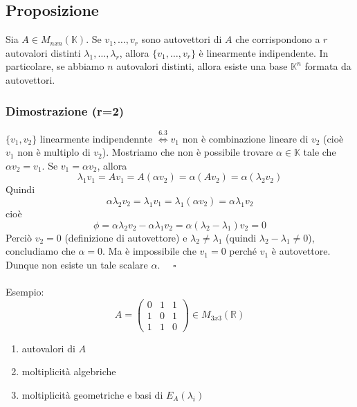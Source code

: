\documentclass[12pt]{article}
\begin{document}
\subsection{Proposizione}

Sia $A \in M_{nxn} (\mathbb{K})$. Se $v_1, \dots, v_r$ sono autovettori di $A$ che corrispondono a $r$ autovalori distinti $\lambda_1, \dots, \lambda_r$, allora $\{v_1, \dots, v_r\}$ è linearmente indipendente. In particolare, se abbiamo $n$ autovalori distinti, allora esiste una base $\mathbb{K}^n$ formata da autovettori.

 \subsubsection{Dimostrazione (r=2)}

$\{v_1, v_2\}$ linearmente indipendennte $\stackrel{6.3}{\iff} v_1$ non è combinazione lineare di $v_2$ (cioè $v_1$ non è multiplo di $v_2$). Mostriamo che non è possibile trovare $\alpha \in \mathbb{K}$ tale che $\alpha v_2 = v_1$.
Se $v_1 =  \alpha v_2$, allora \[\lambda_1 v_1 = Av_1 = A (\alpha v_2) = \alpha (Av_2) = \alpha(\lambda_2 v_2)\]
Quindi
\[\alpha \lambda_2 v_2 = \lambda_1 v_1 = \lambda_1 (\alpha v_2) = \alpha\lambda_1v_2\]
cioè \[\phi = \alpha \lambda_2 v_2 - \alpha\lambda_1v_2 = \alpha (\lambda_2 - \lambda_1)v_2 = 0\]
Perciò $v_2 = 0$ (definizione di autovettore) e $\lambda_2 \neq \lambda_1$ (quindi $\lambda_2 - \lambda_1 \neq  0$), concludiamo che $\alpha = 0$. Ma è impossibile che $v_1 = 0$ perché $v_1$ è autovettore.  Dunque non esiste un tale scalare $\alpha$. $\quad \square$
\\\\
Esempio:
\[A = \begin{pmatrix}
    0 & 1 & 1\\
    1 & 0 & 1\\
    1 & 1 & 0
\end{pmatrix} \in M_{3x3} (\mathbb{R})\]

\begin{enumerate}
    \item autovalori di $A$
    \item moltiplicità algebriche
    \item moltiplicità geometriche e basi di $E_A (\lambda_i)$
\end{enumerate}
\end{document}
